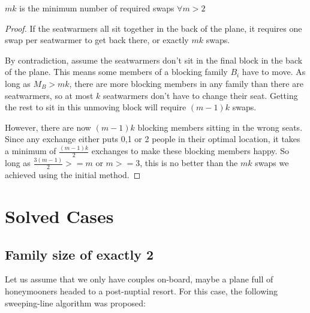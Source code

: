 \documentclass[11pt,twocolumn]{article}
\begin{document}
\begin{figure}[H]
\centering
{}
\end{figure}

\begin{lem}
$mk$ is the minimum number of required swaps $\forall m > 2$
\end{lem}

\begin{proof}
If the seatwarmers all sit together in the back of the plane, it requires one swap per seatwarmer to get back there, or exactly $mk$ swaps.  

By contradiction, assume the seatwarmers don't sit in the final block in the back of the plane.  This means some members of a blocking family $B_i$ have to move.  As long as $M_B > mk$, there are more blocking members in any family than there are seatwarmers, so at most $k$ seatwarmers don't have to change their seat.  Getting the rest to sit in this unmoving block will require $(m-1)k$ swaps.

However, there are now $(m-1)k$ blocking members sitting in the wrong seats.  Since any exchange either puts 0,1 or 2 people in their optimal location, it takes a minimum of $\frac{(m-1)k}{2}$ exchanges to make these blocking members happy.  So long as $\frac{3(m-1)}{2} >= m$ or $m>=3$, this is no better than the $mk$ swaps we achieved using the initial method.
\end{proof}


\section{Solved Cases}

\subsection{Family size of exactly 2}

\noindent
Let us assume that we only have couples on-board, maybe a plane full of honeymooners headed to a post-nuptial resort. For this case, the following sweeping-line algorithm was proposed:
\end{document}
